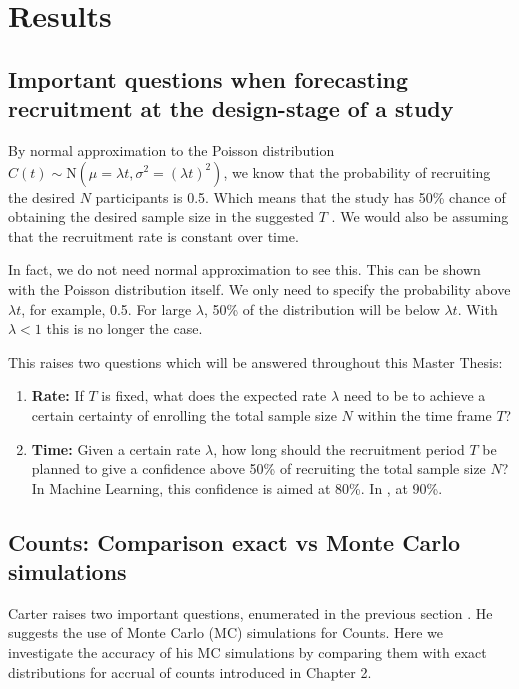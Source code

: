 

\chapter{Results}

\section{Important questions when forecasting recruitment at the design-stage of a study}

By normal approximation to the Poisson distribution $C(t)\sim \textrm{N}(\mu=\lambda t, \sigma^2=(\lambda t)^2)$, we know that the probability of recruiting the desired $N$ participants is 0.5. Which means that the study has 50\% chance of obtaining the desired sample size in the suggested $T$ \citep{carter2004application}. We would also be assuming that the recruitment rate is constant over time.

In fact, we do not need normal approximation to see this. This can be shown with the Poisson distribution itself. We only need to specify the probability above $\lambda t$, for example, 0.5. For large $\lambda$, 50\% of the distribution will be below $\lambda t$. With $\lambda < 1$ this is no longer the case. 

This raises two questions which will be answered throughout this Master Thesis:
\begin{enumerate}
\item \textbf{Rate:} If $T$ is fixed, what does the expected rate $\lambda$ need to be to achieve a certain certainty of enrolling the total sample size $N$ within the time frame $T$?
\item \textbf{Time:} Given a certain rate $\lambda$, how long should the recruitment period $T$ be planned to give a confidence above 50\% of recruiting the total sample size $N$? In Machine Learning, this confidence is aimed at 80\%. In \cite{carter2004application}, at 90\%.
\end{enumerate}

\section{Counts: Comparison exact vs Monte Carlo simulations}

Carter raises two important questions, enumerated in the previous section \citep{carter2004application, carter2005practical}. He suggests the use of Monte Carlo (MC) simulations for Counts. Here we investigate the accuracy of his MC simulations by comparing them with exact distributions for accrual of counts introduced in Chapter 2. 

